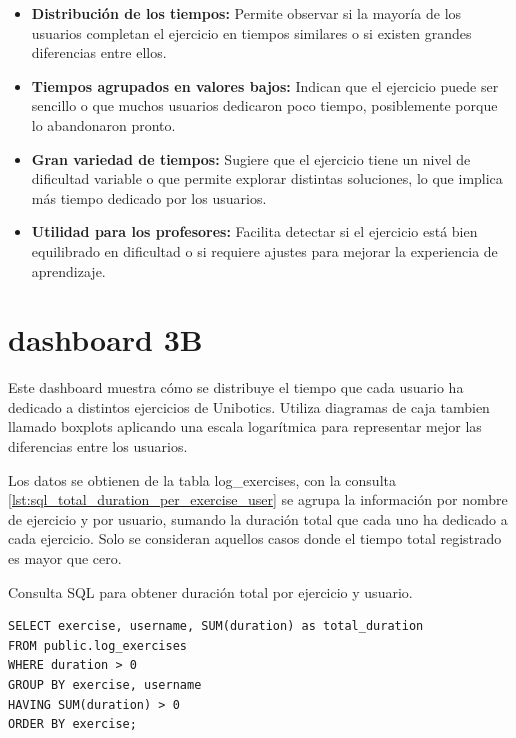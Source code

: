 \documentclass[a4paper, 12pt]{book}
\begin{document}
\begin{itemize}
  \item \textbf{Distribución de los tiempos:} Permite observar si la mayoría de los usuarios completan el ejercicio en tiempos similares o si existen grandes diferencias entre ellos.

  \item \textbf{Tiempos agrupados en valores bajos:} Indican que el ejercicio puede ser sencillo o que muchos usuarios dedicaron poco tiempo, posiblemente porque lo abandonaron pronto.

  \item \textbf{Gran variedad de tiempos:} Sugiere que el ejercicio tiene un nivel de dificultad variable o que permite explorar distintas soluciones, lo que implica más tiempo dedicado por los usuarios.

  \item \textbf{Utilidad para los profesores:} Facilita detectar si el ejercicio está bien equilibrado en dificultad o si requiere ajustes para mejorar la experiencia de aprendizaje.
  
\end{itemize}


\section{dashboard 3B}

Este dashboard muestra cómo se distribuye el tiempo que cada usuario ha dedicado a distintos ejercicios de Unibotics. Utiliza diagramas de caja tambien llamado boxplots aplicando una escala logarítmica para representar mejor las diferencias entre los usuarios.

Los datos se obtienen de la tabla log\_exercises, con la consulta \ref{lst:sql_total_duration_per_exercise_user} se agrupa la información por nombre de ejercicio y por usuario, sumando la duración total que cada uno ha dedicado a cada ejercicio. Solo se consideran aquellos casos donde el tiempo total registrado es mayor que cero.

\begin{listing}[h!]
    \caption{Consulta SQL para obtener duración total por ejercicio y usuario.}{}
    \label{lst:sql_total_duration_per_exercise_user}
    \begin{verbatim}
SELECT exercise, username, SUM(duration) as total_duration
FROM public.log_exercises
WHERE duration > 0
GROUP BY exercise, username
HAVING SUM(duration) > 0
ORDER BY exercise;
    \end{verbatim}
\end{listing}
\end{document}
